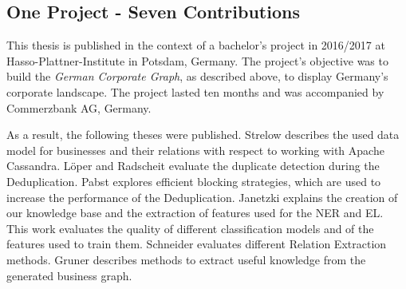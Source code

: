 \subsection*{One Project - Seven Contributions}
This thesis is published in the context of a bachelor's project in 2016/2017 at Hasso-Plattner-Institute in Potsdam, Germany. The project's objective was to build the \emph{German Corporate Graph}, as described above, to display Germany's corporate landscape. The project lasted ten months and was accompanied by Commerzbank AG, Germany.\par
As a result, the following theses were published. Strelow \cite{strelow} describes the used data model for businesses and their relations with respect to working with Apache Cassandra. Löper and Radscheit \cite{loeperradscheit} evaluate the duplicate detection during the Deduplication. Pabst \cite{pabst} explores efficient blocking strategies, which are used to increase the performance of the Deduplication. Janetzki \cite{janetzki} explains the creation of our knowledge base and the extraction of features used for the NER and EL. This work evaluates the quality of different classification models and of the features used to train them. Schneider \cite{schneider} evaluates different Relation Extraction methods. Gruner \cite{gruner} describes methods to extract useful knowledge from the generated business graph.\par
